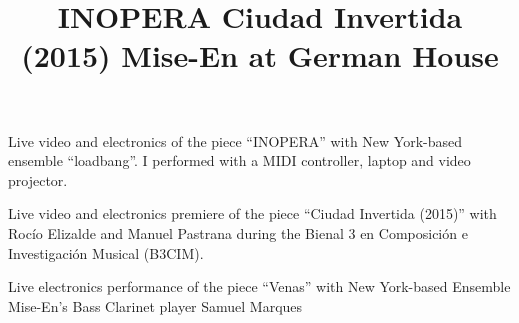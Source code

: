  \title{ INOPERA }
 \begin{position}
{ Live video and electronics of the piece ``INOPERA'' with New York-based ensemble ``loadbang''. I performed with a MIDI controller, laptop and video projector. }
\end{position}

 \title{ Ciudad Invertida (2015) }
 \begin{position}
{ Live video and electronics premiere of the piece ``Ciudad Invertida (2015)'' with Rocío Elizalde and Manuel Pastrana during the Bienal 3 en Composición e Investigación Musical (B3CIM).}
\end{position}
 

 \title{ Mise-En at German House}
 \begin{position}
{ Live electronics performance of the piece ``Venas'' with New York-based Ensemble Mise-En's Bass Clarinet player Samuel Marques}
\end{position}
 
